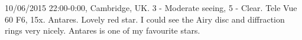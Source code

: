 \item 10/06/2015 22:00-0:00, Cambridge, UK. 3 - Moderate seeing, 5 - Clear. Tele Vue 60 F6, 15x. Antares. Lovely red star. I could see the Airy disc and diffraction rings very nicely. Antares is one of my favourite stars. 
